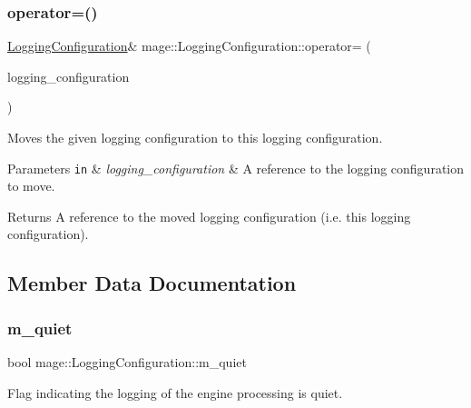 \subsubsection{\texorpdfstring{operator=()}{operator=()}\hspace{0.1cm}{\footnotesize\ttfamily [2/2]}}
{\footnotesize\ttfamily \hyperlink{classmage_1_1_logging_configuration}{Logging\+Configuration}\& mage\+::\+Logging\+Configuration\+::operator= (\begin{DoxyParamCaption}\item[{\hyperlink{classmage_1_1_logging_configuration}{Logging\+Configuration} \&\&}]{logging\+\_\+configuration }\end{DoxyParamCaption})\hspace{0.3cm}{\ttfamily [default]}}

Moves the given logging configuration to this logging configuration.


\begin{DoxyParams}[1]{Parameters}
\mbox{\tt in}  & {\em logging\+\_\+configuration} & A reference to the logging configuration to move. \\
\hline
\end{DoxyParams}
\begin{DoxyReturn}{Returns}
A reference to the moved logging configuration (i.\+e. this logging configuration). 
\end{DoxyReturn}


\subsection{Member Data Documentation}
\hypertarget{classmage_1_1_logging_configuration_a38f457d5db84d15e008841ca8653b47c}{}\label{classmage_1_1_logging_configuration_a38f457d5db84d15e008841ca8653b47c} 
\subsubsection{\texorpdfstring{m\+\_\+quiet}{m\_quiet}}
{\footnotesize\ttfamily bool mage\+::\+Logging\+Configuration\+::m\+\_\+quiet\hspace{0.3cm}{\ttfamily [private]}}

Flag indicating the logging of the engine processing is quiet. \hypertarget{classmage_1_1_logging_configuration_a60f052c2bb702d8153188e93f00427ac}{}\label{classmage_1_1_logging_configuration_a60f052c2bb702d8153188e93f00427ac} 
